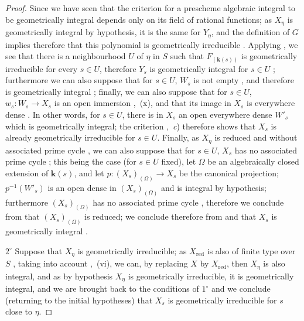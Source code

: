 \begin{proof}
Since we have seen  that the criterion for a prescheme algebraic integral to be geometrically integral depends only on its field of rational functions; as $X_\eta$ is geometrically integral by hypothesis, it is the same for $Y_\eta$, and the definition of $G$ implies therefore that this polynomial is geometrically irreducible .
Applying , we see that there is a neighbourhood $U$ of $\eta$ in $S$ such that $F_{(\boldsymbol{k}(s))}$ is geometrically irreducible for every $s\in U$, therefore $Y_s$ is geometrically integral for $s\in U$ ; furthermore we can also suppose that for $s\in U$, $W_s$ is not empty , and therefore is geometrically integral ; finally, we can also suppose that for $s\in U$, $w_s:W_s\to X_s$ is an open immersion ,~(x), and that its image in $X_s$ is everywhere dense .
In other words, for $s\in U$, there is in $X_s$ an open everywhere dense $W'_s$ which is geometrically integral; the criterion ,~\emph{c}) therefore shows that $X_s$ is already geometrically irreducible for $s\in U$.
Finally, as $X_\eta$ is reduced and without associated prime cycle , we can also suppose that for $s\in U$, $X_s$ has no associated prime cycle ; this being the case (for $s\in U$ fixed), let $\Omega$ be an algebraically closed extension of $\boldsymbol{k}(s)$, and let $p:(X_s)_{(\Omega)}\to X_s$ be the canonical projection; $p^{-1}(W'_s)$ is an open dense in $(X_s)_{(\Omega)}$  and is integral by hypothesis; furthermore $(X_s)_{(\Omega)}$ has no associated prime cycle , therefore we conclude from  that $(X_s)_{(\Omega)}$ is reduced; we conclude therefore from  and  that $X_s$ is geometrically integral .

$2^\circ$ Suppose that $X_\eta$ is geometrically irreducible; as $X_{\mathrm{red}}$ is also of finite type over $S$ , taking into account ,~(vi), we can, by replacing $X$ by $X_{\mathrm{red}}$, then $X_\eta$ is also integral, and as by hypothesis $X_\eta$ is geometrically irreducible, it is geometrically integral, and we are brought back to the conditions of $1^\circ$ and we conclude (returning to the initial hypotheses) that $X_s$ is geometrically irreducible for $s$ close to $\eta$.



\end{proof}
